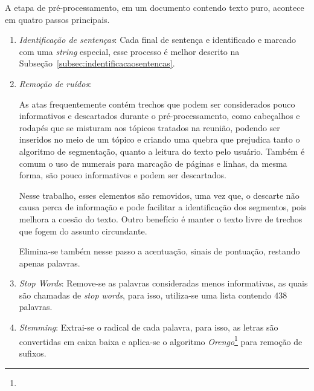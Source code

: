 	A etapa de pré-processamento, em um documento contendo texto puro, acontece em quatro passos principais. 

	
\begin{enumerate}


%
\item \textit{Identificação de sentenças}: 
Cada final de sentença e identificado e marcado com uma \textit{string} especial, esse processo é melhor descrito na Subseção~\ref{subsec:indentificacaosentencas}.
%

%	
\item \textit{Remoção de ruídos}:

As atas frequentemente contém trechos que podem ser considerados pouco informativos e descartados durante o pré-processamento, como cabeçalhos e rodapés que se misturam aos tópicos tratados na reunião, podendo ser  inseridos no meio de um tópico e criando uma quebra que prejudica tanto o algoritmo de segmentação, quanto a leitura do texto pelo usuário.
Também é comum o uso de numerais para marcação de páginas e linhas, da mesma forma, são pouco informativos e podem ser descartados.


Nesse trabalho, esses elementos são removidos, uma vez que, o descarte não causa perca de informação e pode facilitar a identificação dos segmentos, pois melhora a coesão do texto. Outro benefício é manter o texto livre de trechos que fogem do assunto circundante.

Elimina-se também nesse passo a acentuação, sinais de pontuação, restando apenas palavras.  



%	
\item \textit{Stop Words}: 
Remove-se as palavras consideradas menos informativas, as quais são chamadas de \textit{stop words}, para isso, utiliza-se uma lista contendo 438 palavras. 

%
\item \textit{Stemming}:
Extrai-se o radical de cada palavra, para isso, as letras são convertidas em caixa baixa e aplica-se o algoritmo \textit{Orengo}\footnote{\urlorengo} para remoção de sufixos.


\end{enumerate}
	
